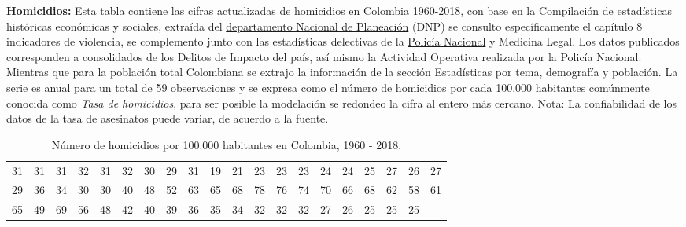 \documentclass[a4paper]{article}\usepackage[]{graphicx}\usepackage[]{color}
\begin{document}
\textbf{Homicidios:} Esta tabla contiene las cifras actualizadas de homicidios en Colombia 1960-2018, con base en la Compilación de estadísticas históricas económicas y sociales, extraída del \href{https://www.dnp.gov.co/estudios-y-publicaciones/estudios-economicos/Paginas/estadisticas-historicas-de-colombia.aspx}{departamento Nacional de Planeación} (DNP) se consulto específicamente el capítulo 8 indicadores de violencia, se complemento junto con las estadísticas delectivas de la \href{https://www.policia.gov.co/grupo-información-criminalidad/estadistica-delictiva}{Policía Nacional} y Medicina Legal. Los datos publicados corresponden a consolidados de los Delitos de Impacto del país, así mismo la Actividad Operativa realizada por la Policía Nacional. Mientras que para la población total Colombiana se extrajo la información de la sección Estadísticas por tema, demografía y población. La serie es anual para un total de 59 observaciones y se expresa como el número de homicidios por cada 100.000 habitantes comúnmente conocida como \emph{Tasa de homicidios}, para ser posible la modelación se redondeo la cifra al entero más cercano. Nota: La confiabilidad de los datos de la tasa de asesinatos puede variar, de acuerdo a la fuente.

\begin{table}[ht]
\centering
\begin{tabular}{rrrrrrrrrrrrrrrrrrrr}
  \hline
  \hline
31 & 31 & 31 & 32 & 31 & 32 & 30 & 29 & 31 & 19 & 21 & 23 & 23 & 23 & 24 & 24 & 25 & 27 & 26 & 27 \\ 
  29 & 36 & 34 & 30 & 30 & 40 & 48 & 52 & 63 & 65 & 68 & 78 & 76 & 74 & 70 & 66 & 68 & 62 & 58 & 61 \\ 
  65 & 49 & 69 & 56 & 48 & 42 & 40 & 39 & 36 & 35 & 34 & 32 & 32 & 32 & 27 & 26 & 25 & 25 & 25 &  \\ 
   \hline
\end{tabular}
\caption{Número de homicidios por 100.000 habitantes en Colombia, 1960 - 2018.} 
\end{table}


\vspace{5mm} %
\end{document}
